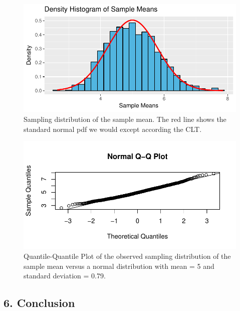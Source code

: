 \documentclass[]{article}
\begin{document}
\begin{figure}[h]

{\centering \includegraphics{exponential_distribution_files/figure-latex/plot_hist_2-1} 

}

\caption{\label{fig:fig_hist_2}Sampling distribution of the sample mean. The red line shows the standard normal pdf we would except according the CLT.}\label{fig:plot_hist_2}
\end{figure}

\begin{figure}[h]

{\centering \includegraphics{exponential_distribution_files/figure-latex/unnamed-chunk-6-1} 

}

\caption{\label{fig:fig_qqnorm}Quantile-Quantile Plot of the observed sampling distribution of the sample mean versus a normal distribution with mean = 5 and standard deviation = 0.79.}\label{fig:unnamed-chunk-6}
\end{figure}

\subsection{6. Conclusion}\label{conclusion}
\end{document}
